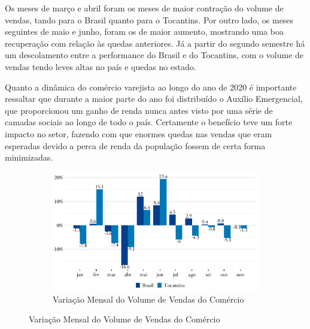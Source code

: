   
\par Os meses de março e abril foram os meses de maior contração do volume de vendas, tando para o Brasil quanto para o Tocantins. Por outro lado, os meses seguintes de maio e junho, foram os de maior aumento, mostrando uma boa recuperação com relação às quedas anteriores. Já a partir do segundo semestre há um descolamento entre a performance do Brasil e do Tocantins, com o volume de vendas tendo leves altas no país e quedas no estado.
\par Quanto a dinâmica do comércio varejista ao longo do ano de 2020 é importante ressaltar que durante a maior parte do ano foi distribuído o Auxílio Emergencial, que proporcionou um ganho de renda nunca antes visto por uma série de camadas sociais ao longo de todo o país. Certamente o benefício teve um forte impacto no setor, fazendo com que enormes quedas nas vendas que eram esperadas devido a perca de renda da população fossem de certa forma minimizadas.
\begin{figure}[!h]
	\begin{subfigure}{\linewidth}
		\caption{Variação Mensal do Volume de Vendas do Comércio}
		\label{fig:pmc}
		\includegraphics{fig/pmc_volume.pdf}
	\end{subfigure}
\end{figure}

